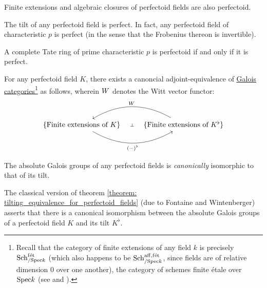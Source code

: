                 \begin{lemma}
                    Finite extensions and algebraic closures of perfectoid fields are also perfectoid.  
                \end{lemma}
                \begin{lemma} \label{prop: tilts_are_perfect}
                    The tilt of any perfectoid field is perfect. In fact, any perfectoid field of characteristic $p$ is perfect (in the sense that the Frobenius thereon is invertible).  
                \end{lemma}
                \begin{lemma} \label{prop: tilts_are_perfectoid}
                    A complete Tate ring of prime characteristic $p$ is perfectoid if and only if it is perfect.
                \end{lemma}
                \begin{theorem} \label{theorem: tilting_equivalence_for_perfectoid_fields}
                    For any perfectoid field $K$, there exists a canoncial adjoint-equivalence of \href{https://stacks.math.columbia.edu/tag/0BMQ}{\underline{Galois categories}}\footnote{Recall that the category of finite extensions of any field $k$ is precisely $\mathrm{Sch}_{/\mathrm{Spec} k}^{\mathrm{f\acute{e}t}}$ (which also happens to be $\mathrm{Sch}_{/\mathrm{Spec} k}^{\mathrm{aff}, \mathrm{f\acute{e}t}}$, since fields are of relative dimension $0$ over one another), the category of schemes finite \'etale over $\mathrm{Spec} k$ (see \cite[\href{https://stacks.math.columbia.edu/tag/0BL6}{Tag 0BL6}]{stacks} and \cite[\href{https://stacks.math.columbia.edu/tag/00U3}{Tag 00U3}]{stacks}).} as follows, wherein $W$ denotes the Witt vector functor:
                        $$
                            \begin{tikzcd}
                            	{\{\text{Finite extensions of $K$}\}} & {\{\text{Finite extensions of $K^{\flat}$}\}}
                            	\arrow[""{name=0, anchor=center, inner sep=0}, "{(-)^{\flat}}"', bend right, from=1-1, to=1-2]
                            	\arrow[""{name=1, anchor=center, inner sep=0}, "\Witt"', bend right, from=1-2, to=1-1]
                            	\arrow["\dashv"{anchor=center, rotate=-90}, draw=none, from=1, to=0]
                            \end{tikzcd}
                        $$
                \end{theorem}
                \begin{corollary}
                    The absolute Galois groups of any perfectoid fields is \textit{canonically} isomorphic to that of its tilt.
                \end{corollary}
                \begin{example}
                    The classical version of theorem \ref{theorem: tilting_equivalence_for_perfectoid_fields} (due to Fontaine and Wintenberger) asserts that there is a canonical isomorphism between the absolute Galois groups of a perfectoid field $K$ and its tilt $K^{\flat}$.
                \end{example}
                
